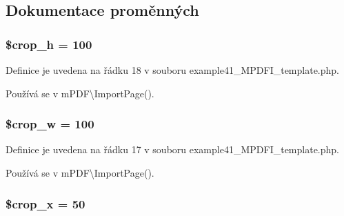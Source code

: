 \subsection{Dokumentace proměnných}
\hypertarget{example41___m_p_d_f_i__template_8php_a1e8e7a49d522c94ac4195588cfdbad23}{
\subsubsection[{\$crop\-\_\-h}]{\setlength{\rightskip}{0pt plus 5cm}\$crop\-\_\-h = 100}}\label{example41___m_p_d_f_i__template_8php_a1e8e7a49d522c94ac4195588cfdbad23}


Definice je uvedena na řádku 18 v souboru example41\-\_\-\-M\-P\-D\-F\-I\-\_\-template.\-php.



Používá se v m\-P\-D\-F\textbackslash{}\-Import\-Page().

\hypertarget{example41___m_p_d_f_i__template_8php_a02611a68d4ceff645e8bdfaf542d2639}{
\subsubsection[{\$crop\-\_\-w}]{\setlength{\rightskip}{0pt plus 5cm}\$crop\-\_\-w = 100}}\label{example41___m_p_d_f_i__template_8php_a02611a68d4ceff645e8bdfaf542d2639}


Definice je uvedena na řádku 17 v souboru example41\-\_\-\-M\-P\-D\-F\-I\-\_\-template.\-php.



Používá se v m\-P\-D\-F\textbackslash{}\-Import\-Page().

\hypertarget{example41___m_p_d_f_i__template_8php_a61d0a2f7a16974228a10fc21d588c1d3}{
\subsubsection[{\$crop\-\_\-x}]{\setlength{\rightskip}{0pt plus 5cm}\$crop\-\_\-x = 50}}\label{example41___m_p_d_f_i__template_8php_a61d0a2f7a16974228a10fc21d588c1d3}


